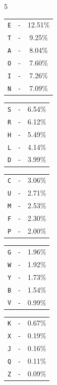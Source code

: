 \documentclass{article}
\numberwithin{figure}{section}
\numberwithin{equation}{section}
\begin{document}
\begin{multicols}{5}
\begin{center}
\begin{tabular}{ccc}
\verb|E| & - & 12.51\% \\
\verb|T| & - & 9.25\% \\
\verb|A| & - & 8.04\% \\
\verb|O| & - & 7.60\% \\
\verb|I| & - & 7.26\% \\
\verb|N| & - & 7.09\% \\
\end{tabular}
\end{center}

\begin{center}
\begin{tabular}{ccc}
\verb|S| & - & 6.54\% \\
\verb|R| & - & 6.12\% \\
\verb|H| & - & 5.49\% \\
\verb|L| & - & 4.14\% \\
\verb|D| & - & 3.99\% \\
\end{tabular}
\end{center}

\begin{center}
\begin{tabular}{ccc}
\verb|C| & - & 3.06\% \\
\verb|U| & - & 2.71\% \\
\verb|M| & - & 2.53\% \\
\verb|F| & - & 2.30\% \\
\verb|P| & - & 2.00\% \\
\end{tabular}
\end{center}

\begin{center}
\begin{tabular}{ccc}
\verb|G| & - & 1.96\% \\
\verb|W| & - & 1.92\% \\
\verb|Y| & - & 1.73\% \\
\verb|B| & - & 1.54\% \\
\verb|V| & - & 0.99\% \\
\end{tabular}
\end{center}

\begin{center}
\begin{tabular}{ccc}
\verb|K| & - & 0.67\% \\
\verb|X| & - & 0.19\% \\
\verb|J| & - & 0.16\% \\
\verb|Q| & - & 0.11\% \\
\verb|Z| & - & 0.09\% \\
\end{tabular}
\end{center}
\end{multicols}
\end{document}
